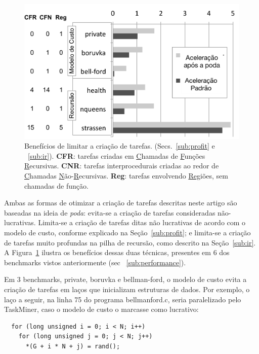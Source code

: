 \documentclass[sigconf]{acmart}
\newcommand\Taskminer{\mbox{\textsf{TaskMiner}}}
\begin{document}
\begin{figure}[b!]
\begin{center}
\includegraphics[width=1\columnwidth]{images/Optimizations}
\caption{Benefícios de limitar a criação de tarefas. (Secs.~\ref{sub:profit} e ~\ref{sub:ir}).
\textbf{CFR}: tarefas criadas em \underline{C}hamadas de \underline{F}unções \underline{R}ecursivas.
\textbf{CNR}: tarefas interprocedurais criadas ao redor de \underline{C}hamadas  \underline{N}ão-\underline{R}ecursivas.
\textbf{Reg}: tarefas envolvendo \underline{Reg}iões, sem chamadas de função.}
\label{fig:Optimizations}
\end{center}
\end{figure}

Ambas as formas de 
otimizar a criação de tarefas descritas neste artigo são baseadas na ideia de 
{\em poda}: evita-se a criação de tarefas consideradas não-lucrativas. 
Limita-se a criação de tarefas ditas não lucrativas de acordo com o modelo de custo, 
conforme explicado na 
Seção~\ref{sub:profit}; e limita-se a criação de tarefas muito profundas na pilha de recursão, 
como descrito na Seção~\ref{sub:ir}. A Figura~\ref{fig:Optimizations} ilustra os benefícios dessas duas técnicas,
presentes em 6 dos benchmarks vistos anteriormente (sec ~\ref{sub:performance}).

Em 3 benchmarks, \textsf{private}, \textsf{boruvka} e
\textsf{bellman-ford}, o modelo de custo evita a criação de tarefas em laços que inicializam estruturas de dados.
Por exemplo, o laço a seguir, na linha 75 do programa \textsf{bellmanford.c}, seria paralelizado pelo
\Taskminer{}, caso o modelo de custo o marcasse como lucrativo:

\begin{verbatim}
  for (long unsigned i = 0; i < N; i++)
    for (long unsigned j = 0; j < N; j++)
      *(G + i * N + j) = rand();
\end{verbatim}
\end{document}
